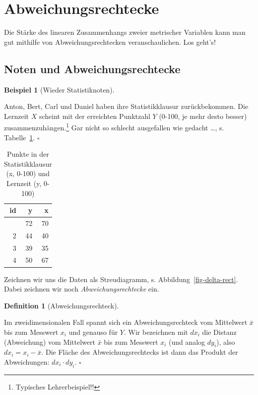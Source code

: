 \documentclass[
  letterpaper,
  oneside,
  open=any]{scrbook}
\theoremstyle{definition}
\theoremstyle{definition}
\newtheorem{example}{Beispiel}[chapter]
\theoremstyle{definition}
\newtheorem{definition}{Definition}[chapter]
\theoremstyle{remark}
\begin{document}
\section{Abweichungsrechtecke}\label{sec-cov}

Die Stärke des linearen Zusammenhangs zweier metrischer Variablen kann
man gut mithilfe von Abweichungsrechtecken veranschaulichen. Los geht's!

\subsection{Noten und
Abweichungsrechtecke}\label{noten-und-abweichungsrechtecke}

\begin{example}[Wieder
Statistiknoten]\protect\hypertarget{exm-noten2}{}\label{exm-noten2}

Anton, Bert, Carl und Daniel haben ihre Statistikklausur zurückbekommen.
Die Lernzeit \(X\) scheint mit der erreichten Punktzahl \(Y\) (0-100, je
mehr desto besser) zusammenzuhängen.\footnote{ Typisches
  Lehrerbeispiel!!} Gar nicht so schlecht ausgefallen wie gedacht
\ldots, s. Tabelle~\ref{tbl-noten2}. \(\square\)

\end{example}

\begin{longtable}[]{@{}rrr@{}}

\caption{\label{tbl-noten2}Punkte in der Statistikklausur (x, 0-100) und
Lernzeit (y, 0-100)}

\tabularnewline

\toprule\noalign{}
id & y & x \\
\midrule\noalign{}
\endhead
\bottomrule\noalign{}
\endlastfoot
1 & 72 & 70 \\
2 & 44 & 40 \\
3 & 39 & 35 \\
4 & 50 & 67 \\

\end{longtable}

Zeichnen wir uns die Daten als Streudiagramm, s.
Abbildung~\ref{fig-delta-rect}. Dabei zeichnen wir noch
\emph{Abweichungsrechtecke} ein.

\begin{definition}[Abweichungsrechteck]\protect\hypertarget{def-abweichungsrechteck}{}\label{def-abweichungsrechteck}

Im zweidimensionalen Fall spannt sich ein Abweichungsrechteck vom
Mittelwert \(\bar{x}\) bis zum Messwert \(x_i\) und genauso für \(Y\).
Wir bezeichnen mit \(dx_i\) die Distanz (Abweichung) vom Mittelwert
\(\bar{x}\) bis zum Messwert \(x_i\) (und analog \(dy_i\)), also
\(dx_i = x_i - \bar{x}\). Die Fläche des Abweichungsrechtecks ist dann
das Produkt der Abweichungen: \(dx_i \cdot dy_i\). \(\square\)

\end{definition}
\end{document}
